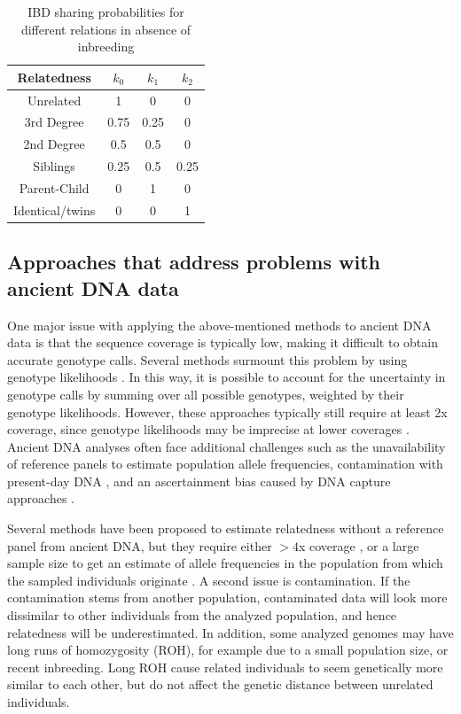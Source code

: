 \documentclass[12pt, letterpaper]{article}
\begin{document}
\begin{table}[h!]
\caption{\label{tab:Table 1}IBD sharing probabilities for different relations in absence of inbreeding}
\begin{tabular}{|c|c|c|c|}
    \hline
    Relatedness & $k_0$ & $k_1$ & $k_2$\\
    \hline
    Unrelated & 1 & 0 & 0\\
    \hline
    3rd Degree & 0.75 & 0.25 & 0\\
    \hline
    2nd Degree & 0.5 & 0.5 & 0\\
    \hline
    Siblings & 0.25 & 0.5 & 0.25\\
    \hline
    Parent-Child & 0 & 1 & 0\\
    \hline
    Identical/twins & 0 & 0 & 1\\
    \hline
\end{tabular}
\label{table1}
\end{table}

\subsection{Approaches that address problems with ancient DNA data}
One major issue with applying the above-mentioned methods to ancient DNA data is that the sequence coverage is typically low, making it difficult to obtain accurate genotype calls.
Several methods surmount this problem by using genotype likelihoods \cite{lipatov_maximum_2015,korneliussen_ngsrelate_2015}. In this way, it is possible to account for the uncertainty in genotype calls by summing over all possible genotypes, weighted by their genotype likelihoods. However, these approaches typically still require at least 2x coverage, since genotype likelihoods may be imprecise at lower coverages \cite{korneliussen_angsd_2014} . Ancient DNA analyses often face additional challenges such as the unavailability of  reference panels to estimate population allele frequencies, contamination with present-day DNA \cite{peyregne_present-day_2020-1}, and an ascertainment bias caused by  DNA capture approaches \cite{prufer_computational_2010, vai_kinship_2020}.

Several methods have been proposed to estimate relatedness without a reference panel from ancient DNA, but they  require either $>4$x coverage \cite{waples_allele_2019}, or a large sample size to get an estimate of allele frequencies in the population from which the sampled individuals originate \cite{theunert_joint_2017}. A second issue is contamination. If the contamination stems from another population, contaminated data will look more dissimilar to other individuals from the analyzed population, and hence relatedness will be underestimated. In addition, some analyzed  genomes may have long runs of homozygosity (ROH), for example due to a small population size, or recent inbreeding. Long ROH cause related individuals to seem genetically more similar to each other, but do not affect the genetic distance between unrelated individuals.
\end{document}
